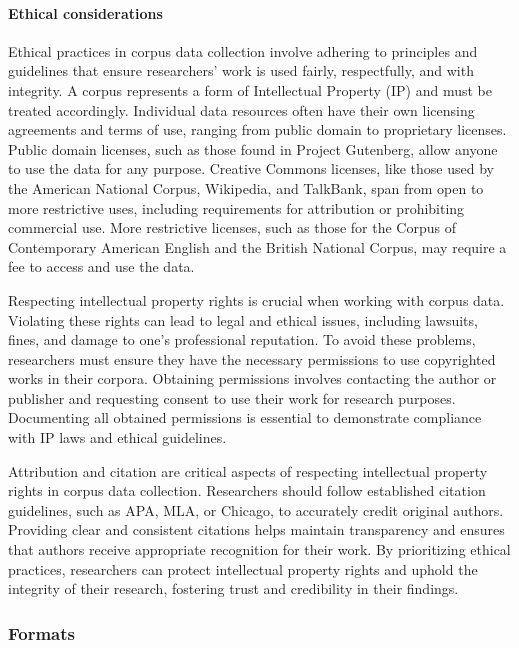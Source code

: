 \documentclass[
  letterpaper,
]{latex/krantz}
\let\oldparagraph\paragraph
\renewcommand{\paragraph}[1]{\oldparagraph{#1}\mbox{}}
\begin{document}
\hypertarget{ethical-considerations}{%
\paragraph{Ethical considerations}\label{ethical-considerations}}

Ethical practices in corpus data collection involve adhering to
principles and guidelines that ensure researchers' work is used fairly,
respectfully, and with integrity. A corpus represents a form of
Intellectual Property (IP) and must be treated accordingly. Individual
data resources often have their own licensing agreements and terms of
use, ranging from public domain to proprietary licenses. Public domain
licenses, such as those found in Project Gutenberg, allow anyone to use
the data for any purpose. Creative Commons licenses, like those used by
the American National Corpus, Wikipedia, and TalkBank, span from open to
more restrictive uses, including requirements for attribution or
prohibiting commercial use. More restrictive licenses, such as those for
the Corpus of Contemporary American English and the British National
Corpus, may require a fee to access and use the data.

Respecting intellectual property rights is crucial when working with
corpus data. Violating these rights can lead to legal and ethical
issues, including lawsuits, fines, and damage to one's professional
reputation. To avoid these problems, researchers must ensure they have
the necessary permissions to use copyrighted works in their corpora.
Obtaining permissions involves contacting the author or publisher and
requesting consent to use their work for research purposes. Documenting
all obtained permissions is essential to demonstrate compliance with IP
laws and ethical guidelines.

Attribution and citation are critical aspects of respecting intellectual
property rights in corpus data collection. Researchers should follow
established citation guidelines, such as APA, MLA, or Chicago, to
accurately credit original authors. Providing clear and consistent
citations helps maintain transparency and ensures that authors receive
appropriate recognition for their work. By prioritizing ethical
practices, researchers can protect intellectual property rights and
uphold the integrity of their research, fostering trust and credibility
in their findings.

\hypertarget{formats}{%
\subsubsection{Formats}\label{formats}}
\end{document}
